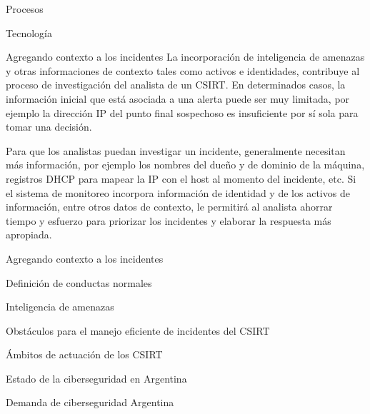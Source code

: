    \begin{section}{Procesos}  
   
   \end{section}
   \begin{section}{Tecnología}  
        \begin{subsection}{Agregando contexto a los incidentes}
        La incorporación de inteligencia de amenazas y otras informaciones de contexto tales como activos e identidades, contribuye al proceso de investigación del analista de un CSIRT. En determinados casos, la información inicial que está asociada a una alerta puede ser muy limitada, por ejemplo la dirección IP del punto final sospechoso es insuficiente por sí sola para tomar una decisión. \par
        Para que los analistas puedan investigar un incidente, generalmente necesitan más información, por ejemplo los nombres del dueño y de dominio de la máquina, registros DHCP para mapear la IP con el host al momento del incidente, etc. Si el sistema de monitoreo incorpora información de identidad y de los activos de información, entre otros datos de contexto, le permitirá al analista ahorrar tiempo y esfuerzo para priorizar los incidentes y elaborar la respuesta más apropiada.\par

        \end{subsection}
        \begin{subsection}{Agregando contexto a los incidentes}
        \end{subsection}
        
        \begin{subsection}{Definición de conductas normales}
        \end{subsection}
        
        \begin{subsection}{Inteligencia de amenazas}
        \end{subsection}
        
        \begin{subsection}{Obstáculos para el manejo eficiente de incidentes del CSIRT}
        \end{subsection}
   \end{section}
      
   \begin{section}{Ámbitos de actuación de los CSIRT}
        \begin{subsection}{Estado de la ciberseguridad en Argentina} 
            \begin{subsubsection}{Demanda de ciberseguridad Argentina}
            \end{subsubsection}
        \end{subsection}
   \end{section}


